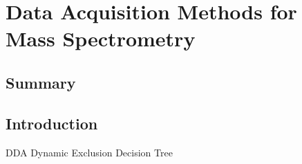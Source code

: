 \chapter{Data Acquisition Methods for Mass Spectrometry}

\section{Summary}

\section{Introduction}


DDA
Dynamic Exclusion
Decision Tree

